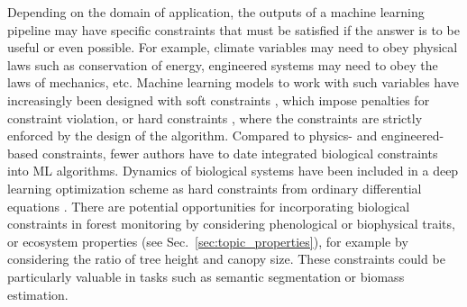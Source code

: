 \documentclass{CUP-JNL-DTM}%
\theoremstyle{definition}
\numberwithin{equation}{section}
\begin{document}
Depending on the domain of application, the outputs of a machine learning pipeline may have specific constraints that must be satisfied if the answer is to be useful or even possible. For example, climate variables may need to obey physical laws such as conservation of energy, engineered systems may need to obey the laws of mechanics, etc. Machine learning models to work with such variables have increasingly been designed with soft constraints \cite{harder_physics-informed_2022,ouaknine_multi-view_2021}, which impose penalties for constraint violation, or hard constraints \cite{donti_dc3_2021,geiss_strict_2021,harder_physics-constrained_2023}, where the constraints are strictly enforced by the design of the algorithm.
Compared to physics- and engineered-based constraints, fewer authors have to date integrated biological constraints into ML algorithms. 
Dynamics of biological systems have been included in a deep learning optimization scheme as hard constraints from ordinary differential equations \cite{yazdani_systems_2020}.
There are potential opportunities for incorporating biological constraints in forest monitoring by considering phenological \cite{richardson_intercomparison_2018} or biophysical traits, or ecosystem properties (see Sec.~\ref{sec:topic_properties}), for example by considering the ratio of tree height and canopy size. These constraints could be particularly valuable in tasks such as semantic segmentation or biomass estimation.
\end{document}
